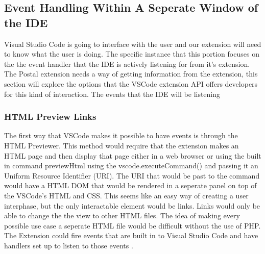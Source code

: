 \documentclass[letterpaper,10pt,titlepage,draftclsnofoot,onecolumn,onesided] {IEEEtran}
\begin{document}
%
\subsection{Event Handling Within A Seperate Window of the IDE}
Visual Studio Code is going to interface with the user and our extension will need to know what the user is doing.
The specific instance that this portion focuses on the the event handler that the IDE is actively listening for from it's extension.
The Postal extension needs a way of getting information from the extension, this section will explore the options that the VSCode extension API offers developers for this kind of interaction. 
The events that the IDE will be listening 

\subsubsection{HTML Preview Links}
The first way that VSCode makes it possible to have events is through the HTML Previewer. \cite{VSCode Documentation} 
This method would require that the extension makes an HTML page and then display that page either in a web browser or using the built in command previewHtml using the vscode.executeCommand() and passing it an Uniform Resource Identifier (URI). 
The URI that would be past to the command would have a HTML DOM that would be rendered in a seperate panel on top of the VSCode's HTML and CSS. 
This seems like an easy way of creating a user interphase, but the only interactable element would be links. 
Links would only be able to change the the view to other HTML files. 
The idea of making every possible use case a seperate HTML file would be difficult without the use of PHP.
The Extension could fire events that are built in to Visual Studio Code and have handlers set up to listen to those events . 
\end{document}
